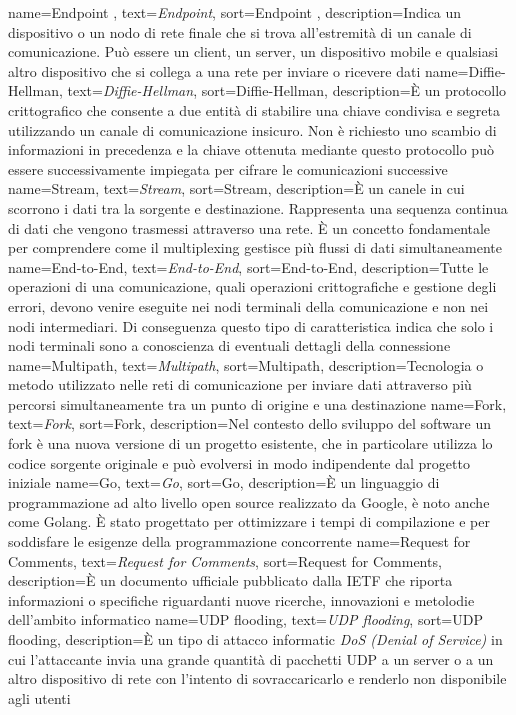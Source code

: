  {
    name=Endpoint ,
    text=\emph{Endpoint},
    sort=Endpoint ,
    description={Indica un dispositivo o un nodo di rete finale che si trova all'estremità di un canale di comunicazione. Può essere un \gls{client}, un \gls{server}, un dispositivo mobile e qualsiasi altro dispositivo che si collega a una rete per inviare o ricevere dati}
}
 {
    name=Diffie-Hellman,
    text=\emph{Diffie-Hellman},
    sort=Diffie-Hellman,
    description={È un protocollo crittografico che consente a due entità di stabilire una chiave condivisa e segreta utilizzando un canale di comunicazione insicuro. Non è richiesto uno scambio di informazioni in precedenza e la chiave ottenuta mediante questo protocollo può essere successivamente impiegata per cifrare le comunicazioni successive}
}
 {
    name=Stream,
    text=\emph{Stream},
    sort=Stream,
    description={È un canele in cui scorrono i dati tra la sorgente e destinazione. Rappresenta una sequenza continua di dati che vengono trasmessi attraverso una rete. È un concetto fondamentale per comprendere come il multiplexing gestisce più flussi di dati simultaneamente}
}
 {
    name=End-to-End,
    text=\emph{End-to-End},
    sort=End-to-End,
    description={Tutte le operazioni di una comunicazione, quali operazioni crittografiche e gestione degli errori, devono venire eseguite nei nodi terminali della comunicazione e non nei nodi intermediari. 
    Di conseguenza questo tipo di caratteristica indica che solo i nodi terminali sono a conoscienza di eventuali dettagli della connessione}
}
 {
    name=Multipath,
    text=\emph{Multipath},
    sort=Multipath,
    description={Tecnologia o metodo utilizzato nelle reti di comunicazione per inviare dati attraverso più percorsi simultaneamente tra un punto di origine e una destinazione}
}
 {
    name=Fork,
    text=\emph{Fork},
    sort=Fork,
    description={Nel contesto dello sviluppo del software un fork è una nuova versione di un progetto esistente, che in particolare utilizza lo codice sorgente originale e può evolversi in modo indipendente dal progetto iniziale}
}
 {
    name=Go,
    text=\emph{Go},
    sort=Go,
    description={È un linguaggio di programmazione ad alto livello open source realizzato da Google, è noto anche come Golang. È stato progettato per ottimizzare i tempi di compilazione e per soddisfare le esigenze della programmazione concorrente}
}
 {
    name=Request for Comments,
    text=\emph{Request for Comments},
    sort=Request for Comments,
    description={È un documento ufficiale pubblicato dalla \gls{IETF} che riporta informazioni o specifiche riguardanti nuove ricerche, innovazioni e metolodie dell'ambito informatico}
}
 {
    name=UDP flooding,
    text=\emph{UDP flooding},
    sort=UDP flooding,
    description={È un tipo di attacco informatic \emph{DoS (Denial of Service)} in cui l'attaccante invia una grande quantità di pacchetti \gls{UDP}{} a un \gls{server} o a un altro dispositivo di rete con l'intento di sovraccaricarlo e renderlo non disponibile agli utenti}
}
